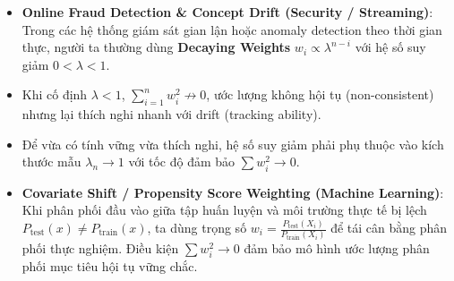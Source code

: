 \documentclass[12pt,a4paper]{article}
\begin{document}
\begin{itemize}
\item
  \textbf{Online Fraud Detection \& Concept Drift (Security / Streaming)}: Trong các hệ thống giám sát gian lận hoặc anomaly detection theo thời gian thực, người ta thường dùng \textbf{Decaying Weights} \(w_i \propto \lambda^{n-i}\) với hệ số suy giảm \(0 < \lambda < 1\).
\item
  Khi cố định \(\lambda < 1\), \(\sum_{i=1}^n w_i^2 \not\to 0\), ước lượng không hội tụ (non-consistent) nhưng lại thích nghi nhanh với drift (tracking ability).
\item
  Để vừa có tính vững vừa thích nghi, hệ số suy giảm phải phụ thuộc vào kích thước mẫu \(\lambda_n \to 1\) với tốc độ đảm bảo \(\sum w_i^2 \to 0\).
\item
  \textbf{Covariate Shift / Propensity Score Weighting (Machine Learning)}: Khi phân phối đầu vào giữa tập huấn luyện và môi trường thực tế bị lệch \(P_{\text{test}}(x) \neq P_{\text{train}}(x)\), ta dùng trọng số \(w_i = \frac{P_{\text{test}}(X_i)}{P_{\text{train}}(X_i)}\) để tái cân bằng phân phối thực nghiệm. Điều kiện \(\sum w_i^2 \to 0\) đảm bảo mô hình ước lượng phân phối mục tiêu hội tụ vững chắc.
\end{itemize}
\end{document}
